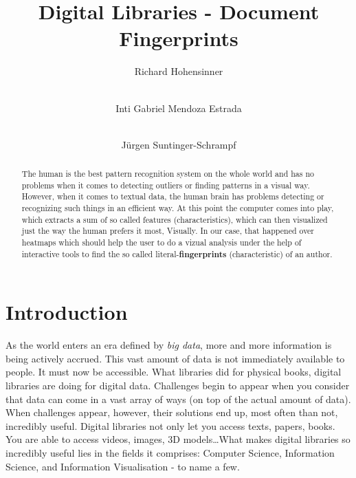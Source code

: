 \documentclass[runningheads]{llncs}
\begin{document}
\title{Digital Libraries - Document Fingerprints}

\author{Richard Hohensinner \and \\
Inti Gabriel Mendoza Estrada \and     \\
Jürgen Suntinger-Schrampf}

\maketitle              %


\begin{abstract}
The human is the best pattern recognition system on the whole world and has no problems when it comes to detecting outliers or finding patterns in a visual way. However, when it comes to textual data, the human brain has problems detecting or recognizing such things in an efficient way. At this point the computer comes into play, which extracts a sum of so called features (characteristics), which can then visualized just the way the human prefers it most, Visually. In our case, that happened over heatmaps which should help the user to do a vizual analysis under the help of interactive tools to find the so called literal-\textbf{fingerprints} (characteristic) of an author.

\end{abstract}


\section{Introduction}
As the world enters an era defined by \textit{big data}, more and more information is being actively accrued. This vast amount of data is not immediately available to people. It must now be accessible. What libraries did for physical books, digital libraries are doing for digital data. Challenges begin to appear when you consider that data can come in a vast array of ways (on top of the actual amount of data). When challenges appear, however, their solutions end up, most often than not, incredibly useful. Digital libraries not only let you access texts, papers, books. You are able to access videos, images, 3D models\ldots What makes digital libraries so incredibly useful lies in the fields it comprises: Computer Science, Information Science, and Information Visualisation - to name a few. 
\end{document}
